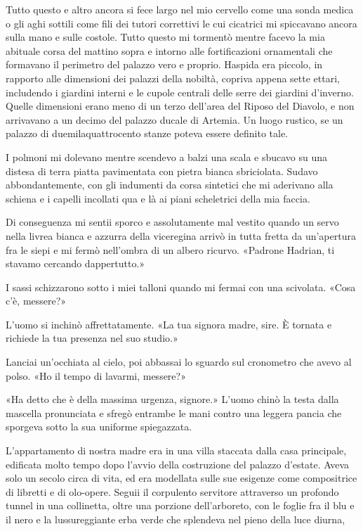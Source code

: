 Tutto questo e altro ancora si fece largo nel mio cervello come una
sonda medica o gli aghi sottili come fili dei tutori correttivi le cui
cicatrici mi spiccavano ancora sulla mano e sulle costole. Tutto questo
mi tormentò mentre facevo la mia abituale corsa del mattino sopra e
intorno alle fortificazioni ornamentali che formavano il perimetro del
palazzo vero e proprio. Haspida era piccolo, in rapporto alle dimensioni
dei palazzi della nobiltà, copriva appena sette ettari, includendo i
giardini interni e le cupole centrali delle serre dei giardini
d'inverno. Quelle dimensioni erano meno di un terzo dell'area del Riposo
del Diavolo, e non arrivavano a un decimo del palazzo ducale di Artemia.
Un luogo rustico, se un palazzo di duemilaquattrocento stanze poteva
essere definito tale.

I polmoni mi dolevano mentre scendevo a balzi una scala e sbucavo su una
distesa di terra piatta pavimentata con pietra bianca sbriciolata.
Sudavo abbondantemente, con gli indumenti da corsa sintetici che mi
aderivano alla schiena e i capelli incollati qua e là ai piani
scheletrici della mia faccia.

Di conseguenza mi sentii sporco e assolutamente mal vestito quando un
servo nella livrea bianca e azzurra della viceregina arrivò in tutta
fretta da un'apertura fra le siepi e mi fermò nell'ombra di un albero
ricurvo. «Padrone Hadrian, ti stavamo cercando dappertutto.»

I sassi schizzarono sotto i miei talloni quando mi fermai con una
scivolata. «Cosa c'è, messere?»

L'uomo si inchinò affrettatamente. «La tua signora madre, sire. È
tornata e richiede la tua presenza nel suo studio.»

Lanciai un'occhiata al cielo, poi abbassai lo sguardo sul cronometro che
avevo al polso. «Ho il tempo di lavarmi, messere?»

«Ha detto che è della massima urgenza, signore.» L'uomo chinò la testa
dalla mascella pronunciata e sfregò entrambe le mani contro una leggera
pancia che sporgeva sotto la sua uniforme spiegazzata.

L'appartamento di nostra madre era in una villa staccata dalla casa
principale, edificata molto tempo dopo l'avvio della costruzione del
palazzo d'estate. Aveva solo un secolo circa di vita, ed era modellata
sulle sue esigenze come compositrice di libretti e di olo-opere. Seguii
il corpulento servitore attraverso un profondo tunnel in una collinetta,
oltre una porzione dell'arboreto, con le foglie fra il blu e il nero e
la lussureggiante erba verde che splendeva nel pieno della luce diurna,

